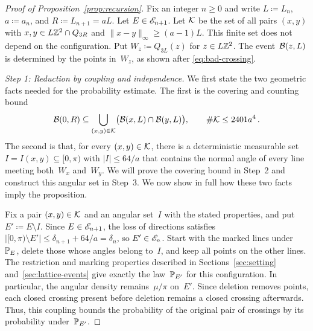 \documentclass[11pt,letterpaper]{article}
\begin{document}
\begin{proof}[Proof of Proposition~\ref{prop:recursion}]
Fix an integer $n\ge0$ and write $L\coloneqq L_n$, $a\coloneqq a_n$, and $R\coloneqq L_{n+1}=aL$. Let $E\in\cE_{n+1}$. Let $\cK$ be the set of all pairs $(x,y)$ with $x,y\in L\Z^2\cap Q_{3R}$ and $\lVert x-y\rVert_\infty\ge(a-1)L$. This finite set does not depend on the configuration. Put $W_z\coloneqq Q_{3L}(z)$ for $z\in L\Z^2$. The event~$\cB(z,L)$ is determined by the points in~$W_z$, as shown after \eqref{eq:bad-crossing}.

\emph{Step 1: Reduction by coupling and independence.} We first state the two geometric facts needed for the probability estimate. The first is the covering and counting bound
\begin{equation}\label{eq:recursion-geometric-cover}
  \cB(0,R)\subseteq\bigcup_{(x,y)\in\cK}\bigl(\cB(x,L)\cap\cB(y,L)\bigr),\qquad\#\cK\le2401a^4\,.
\end{equation}
The second is that, for every $(x,y)\in\cK$, there is a deterministic measurable set $I=I(x,y)\subseteq[0,\pi)$ with $\lvert I\rvert\le64/a$ that contains the normal angle of every line meeting both~$W_x$ and~$W_y$. We will prove the covering bound in Step~2 and construct this angular set in Step~3. We now show in full how these two facts imply the proposition.

Fix a pair $(x,y)\in\cK$ and an angular set~$I$ with the stated properties, and put $E'\coloneqq E\setminus I$. Since $E\in\cE_{n+1}$, the loss of directions satisfies $\lvert[0,\pi)\setminus E'\rvert\le\delta_{n+1}+64/a=\delta_n$, so $E'\in\cE_n$. Start with the marked lines under~$\P_E$, delete those whose angles belong to~$I$, and keep all points on the other lines. The restriction and marking properties described in Sections~\ref{sec:setting} and~\ref{sec:lattice-events} give exactly the law~$\P_{E'}$ for this configuration. In particular, the angular density remains~$\mu/\pi$ on~$E'$. Since deletion removes points, each closed crossing present before deletion remains a closed crossing afterwards. Thus, this coupling bounds the probability of the original pair of crossings by its probability under~$\P_{E'}$.


\end{proof}
\end{document}
